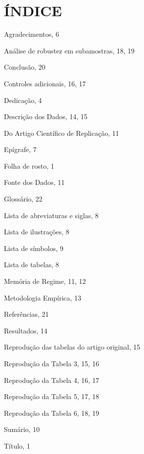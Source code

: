 




\chapter*{ÍNDICE}

{ \setlength{\parindent}{0pt}  %
	

Agradecimentos, 6

Análise de robustez em subamostras, 18, 19

Conclusão, 20

Controles adicionais, 16, 17

Dedicação, 4

Descrição dos Dados, 14, 15

Do Artigo Científico de Replicação, 11

Epígrafe, 7

Folha de rosto, 1

Fonte dos Dados, 11

Glossário, 22

Lista de abreviaturas e siglas, 8

Lista de ilustrações, 8

Lista de símbolos, 9

Lista de tabelas, 8

Memória de Regime, 11, 12

Metodologia Empírica, 13

Referências, 21

Resultados, 14

Reprodução das tabelas do artigo original, 15

Reprodução da Tabela 3, 15, 16

Reprodução da Tabela 4, 16, 17

Reprodução da Tabela 5, 17, 18

Reprodução da Tabela 6, 18, 19

Sumário, 10

Título, 1

	
	
	
	
} %


